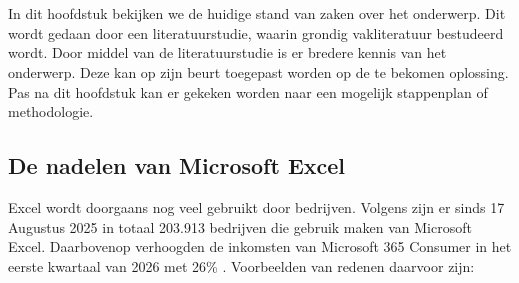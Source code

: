 \chapter{}%
\label{ch:stand-van-zaken}


In dit hoofdstuk bekijken we de huidige stand van zaken over het onderwerp. Dit wordt gedaan door een literatuurstudie, waarin grondig vakliteratuur bestudeerd wordt. Door middel van de literatuurstudie is er bredere kennis van het onderwerp. Deze kan op zijn beurt toegepast worden op de te bekomen oplossing. Pas na dit hoofdstuk kan er gekeken worden naar een mogelijk stappenplan of methodologie.

\section{De nadelen van Microsoft Excel}
Excel wordt doorgaans nog veel gebruikt door bedrijven. Volgens \textcite{Landbase2026} zijn er sinds 17 Augustus 2025 in totaal 203.913 bedrijven die gebruik maken van Microsoft Excel. Daarbovenop verhoogden de inkomsten van Microsoft 365 Consumer in het eerste kwartaal van 2026 met 26\% \autocite{Microsoft2026}. Voorbeelden van redenen daarvoor zijn: 


